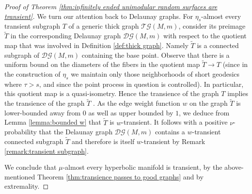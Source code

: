 \documentclass{amsart}
\newcommand{\RR}{\mathbb{R}}
\newcommand{\GraphsU}{\mathcal{GU}}
\newcommand{\Hypers}{\mathcal{H}}
\newcommand{\DelanGraph}{\mathcal{DG}}
\newcommand{\ThickGraph}{\mathcal{TG}}
\theoremstyle{plain}
\numberwithin{equation}{section}
\theoremstyle{definition}
\begin{document}
\begin{proof}[Proof of Theorem \ref{thm:infinitely ended unimodular random surfaces are transient}]
We turn our attention back to Delaunay graphs. For $\eta_s$-almost every transient subgraph $T$ of a generic thick graph $\ThickGraph(M,m)$, consider its preimage $\widetilde T$ in the corresponding Delaunay graph $\DelanGraph(M,m)$ with respect to the quotient map that was involved in Definition \ref{def:thick graph}. Namely $\widetilde{T}$ is a connected subgraph of $\DelanGraph(M,m)$ containing the base point. Observe that there is a uniform bound on the diameters of the fibers in the quotient map $\widetilde{T} \to T$ (since in the construction of $\eta_s$ we  maintain only those neighborhoods of short geodesics where $\tau > s$, and since the point process in question is controlled). In particular, this quotient map is a quasi-isometry. Hence the transience of the graph $T$ implies the transience of the graph $\widetilde T$ \cite[Theorem 3.10]{woess2000random}. As the edge weight function $w$ on the graph $\widetilde{T}$ is lower-bounded away from $0$ as well as upper bounded by $1$, we deduce from Lemma \ref{lemma:bounded w} that $\widetilde{T}$ is $w$-transient. It follows with a positive $\nu$-probability that the Delaunay graph $\DelanGraph(M,m)$ contains a $w$-transient connected subgraph $\widetilde T$ and therefore is itself $w$-transient by Remark \ref{remark:transient subgraph}. 

We conclude that $\mu$-almost every hyperbolic manifold is transient, by the above-mentioned Theorem \ref{thm:transience passes to good graphs} and by extremality.
\end{proof}



 
\end{document}
